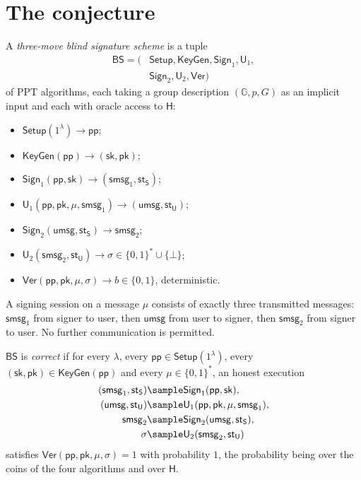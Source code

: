 \documentclass{conjura-conjecture}
\newcommand{\BS}{\mathsf{BS}}
\newcommand{\GG}{\mathbb{G}}
\newcommand{\RO}{\mathsf{H}}
\newcommand{\Setup}{\mathsf{Setup}}
\newcommand{\KeyGen}{\mathsf{KeyGen}}
\newcommand{\Sign}{\mathsf{Sign}}
\newcommand{\Uu}{\mathsf{U}}
\newcommand{\Ver}{\mathsf{Ver}}
\newcommand{\pubp}{\mathsf{pp}}
\newcommand{\seck}{\mathsf{sk}}
\newcommand{\pubk}{\mathsf{pk}}
\newcommand{\smsg}{\mathsf{smsg}}
\newcommand{\umsg}{\mathsf{umsg}}
\newcommand{\stS}{\mathsf{st_S}}
\newcommand{\stU}{\mathsf{st_U}}
\begin{document}
\section{The conjecture}\label{sec:conjectures}

\begin{definition}\label{def:bs}
A \emph{three-move blind signature scheme} is a tuple
\begin{align*}
  \BS = (&\Setup, \KeyGen, \Sign_1, \Uu_1,\\
         &\Sign_2, \Uu_2, \Ver)
\end{align*}
of PPT algorithms, each taking a group description $(\GG, p, G)$ as an
implicit input and each with oracle access to $\RO$:
\begin{itemize}
  \item $\Setup(1^\lambda) \to \pubp$;
  \item $\KeyGen(\pubp) \to (\seck, \pubk)$;
  \item $\Sign_1(\pubp, \seck) \to (\smsg_1, \stS)$;
  \item $\Uu_1(\pubp, \pubk, \mu, \smsg_1) \to (\umsg, \stU)$;
  \item $\Sign_2(\umsg, \stS) \to \smsg_2$;
  \item $\Uu_2(\smsg_2, \stU) \to \sigma \in \{0,1\}^* \cup \{\bot\}$;
  \item $\Ver(\pubp, \pubk, \mu, \sigma) \to b \in \{0,1\}$,
  deterministic.
\end{itemize}
A signing session on a message $\mu$ consists of exactly three transmitted
messages: $\smsg_1$ from signer to user, then $\umsg$ from user to signer,
then $\smsg_2$ from signer to user. No further communication is permitted.
\end{definition}

\begin{definition}[Correctness]\label{def:corr}
$\BS$ is \emph{correct} if for every $\lambda$, every
$\pubp \in \Setup(1^\lambda)$, every
$(\seck, \pubk) \in \KeyGen(\pubp)$ and every $\mu \in \{0,1\}^*$, an
honest execution
\begin{align*}
  (\smsg_1, \stS) &\sample \Sign_1(\pubp, \seck),\\
  (\umsg, \stU) &\sample \Uu_1(\pubp, \pubk, \mu, \smsg_1),\\
  \smsg_2 &\sample \Sign_2(\umsg, \stS),\\
  \sigma &\sample \Uu_2(\smsg_2, \stU)
\end{align*}
satisfies $\Ver(\pubp, \pubk, \mu, \sigma) = 1$ with probability $1$, the
probability being over the coins of the four algorithms and over $\RO$.
\end{definition}
\end{document}
